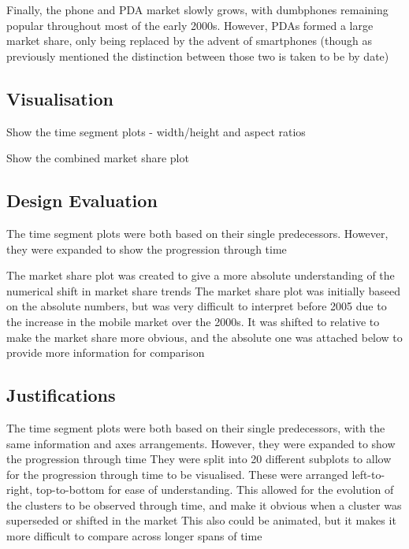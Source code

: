 \documentclass[conference]{IEEEtran}
\begin{document}
Finally, the phone and PDA market slowly grows, with dumbphones remaining popular throughout most of the early 2000s. However, PDAs formed a large market share, only being replaced by the advent of smartphones (though as previously mentioned the distinction between those two is taken to be by date)

\subsection{Visualisation}

Show the time segment plots - width/height and aspect ratios

Show the combined market share plot

\subsection{Design Evaluation}

The time segment plots were both based on their single predecessors. However, they were expanded to show the progression through time

The market share plot was created to give a more absolute understanding of the numerical shift in market share trends
The market share plot was initially baseed on the absolute numbers, but was very difficult to interpret before 2005 due to the increase in the mobile market over the 2000s. It was shifted to relative to make the market share more obvious, and the absolute one was attached below to provide more information for comparison

\subsection{Justifications}

The time segment plots were both based on their single predecessors, with the same information and axes arrangements. However, they were expanded to show the progression through time
They were split into 20 different subplots to allow for the progression through time to be visualised. These were arranged left-to-right, top-to-bottom for ease of understanding. 
This allowed for the evolution of the clusters to be observed through time, and make it obvious when a cluster was superseded or shifted in the market
This also could be animated, but it makes it more difficult to compare across longer spans of time
\end{document}
